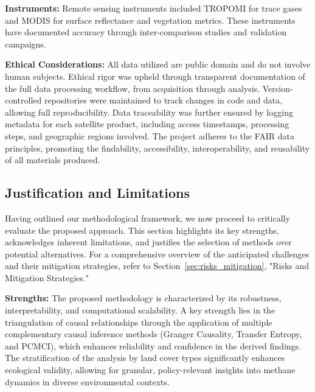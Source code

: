 \textbf{Instruments:}
Remote sensing instruments included TROPOMI for trace gases and MODIS for surface reflectance and vegetation metrics. These instruments have documented accuracy through inter-comparison studies and validation campaigns.

\textbf{Ethical Considerations:}
All data utilized are public domain and do not involve human subjects. Ethical rigor was upheld through transparent documentation of the full data processing workflow, from acquisition through analysis. Version-controlled repositories were maintained to track changes in code and data, allowing full reproducibility. Data traceability was further ensured by logging metadata for each satellite product, including access timestamps, processing steps, and geographic regions involved. The project adheres to the FAIR data principles, promoting the findability, accessibility, interoperability, and reusability of all materials produced.

\subsection{Justification and Limitations}

Having outlined our methodological framework, we now proceed to critically evaluate the proposed approach. This section highlights its key strengths, acknowledges inherent limitations, and justifies the selection of methods over potential alternatives. For a comprehensive overview of the anticipated challenges and their mitigation strategies, refer to Section~\ref{sec:risks_mitigation}, "Risks and Mitigation Strategies."

\textbf{Strengths:}
The proposed methodology is characterized by its robustness, interpretability, and computational scalability. A key strength lies in the triangulation of causal relationships through the application of multiple complementary causal inference methods (Granger Causality, Transfer Entropy, and PCMCI), which enhances reliability and confidence in the derived findings. The stratification of the analysis by land cover types significantly enhances ecological validity, allowing for granular, policy-relevant insights into methane dynamics in diverse environmental contexts.

